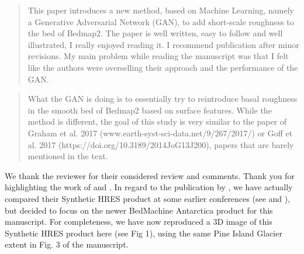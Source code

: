 %
% 


\begin{quote}
\color{blue}
  This paper introduces a new method, based on Machine Learning, namely a Generative Adversarial Network (GAN), to add short-scale roughness to the bed of Bedmap2.
  The paper is well written, easy to follow and well illustrated, I really enjoyed reading it.
  I recommend publication after minor revisions.
  My main problem while reading the manuscript was that I felt like the authors were overselling their approach and the performance of the GAN.
\end{quote}

\begin{quote}
\color{blue}
  What the GAN is doing is to essentially try to reintroduce basal roughness in the smooth bed of Bedmap2 based on surface features.
  While the method is different, the goal of this study is very similar to the paper of Graham et al. 2017 (www.earth-syst-sci-data.net/9/267/2017/) or Goff et al. 2017 (https://doi.org/10.3189/2014JoG13J200), papers that are barely mentioned in the text.
\end{quote}

We thank the reviewer for their considered review and comments.
Thank you for highlighting the work of \citet{GoffConditionalsimulationThwaites2014} and \citet{Grahamhighresolutionsyntheticbed2017}.
In regard to the publication by \citet{Grahamhighresolutionsyntheticbed2017}, we have actually compared their Synthetic HRES product at some earlier conferences (see \citet{LeongDeepBedMapUsingdeep2019} and \citet{LeongDeepBedMapsuperresolutiondeep2019}), but decided to focus on the newer BedMachine Antarctica product for this manuscript.
For completeness, we have now reproduced a 3D image of this Synthetic HRES product here (see Fig 1), using the same Pine Island Glacier extent in Fig. 3 of the manuscript.

\iffalse
\begin{figure}[htbp]
  \texttt{[image: figure-1\_qualitative\_bed\_comparison.png]}
  \caption{
    Comparison of interpolated bed elevation grid products over Pine Island Glacier.
    a) DeepBedMap (ours) at 250 m resolution.
    b) BEDMAP2.
    c) Synthetic HRES product.
    d) BedMachine Antarctica.
  }
  \label{fig:1}
\end{figure}
\fi

